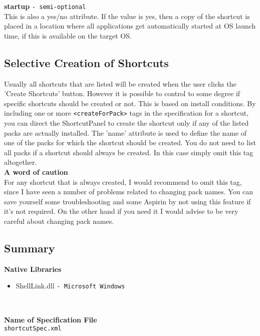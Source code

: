 \textbf{startup} \texttt{- semi-optional}\\

This is also a yes/no attribute. If the value is yes, then a copy of the
shortcut is placed in a location where all applications get automatically
started at OS launch time, if this is available on the target OS.\\

\subsection{Selective Creation of Shortcuts}

Usually all shortcuts that are listed will be created when the user
clicks the 'Create Shortcuts' button. However it is possible to control
to some degree if specific shortcuts should be created or not. This is
based on install conditions. By including one or more \texttt{<createForPack>}
tags in the specification for a shortcut, you can direct the
ShortcutPanel to create the shortcut only if any of the listed packs are
actually installed. The 'name' attribute is used to define the name of
one of the packs for which the shortcut should be created. You do not
need to list all packs if a shortcut should always be created. In this
case simply omit this tag altogether.\\

\textbf{A word of caution}\\

For any shortcut that is always created, I would recommend to omit this
tag, since I have seen a number of problems related to changing pack
names. You can save yourself some troubleshooting and some Aspirin by
not using this feature if it's not required. On the other hand if you
need it I would advise to be very careful about changing pack names.\\

\subsection{Summary}

\textbf{Native Libraries}
\begin{itemize}
\item ShellLink.dll \texttt{- Microsoft Windows}
\end{itemize}\

\textbf{Name of Specification File}\\
\texttt{shortcutSpec.xml}\\

